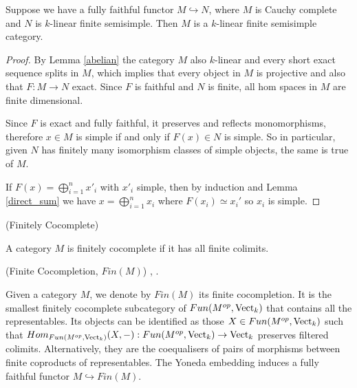 \begin{proposition}\label{cau_semi}

  \noindent Suppose we have a fully faithful functor $M\hookrightarrow N$,
  where $M$ is Cauchy complete and $N$ is $k$-linear finite semisimple. Then
  $M$ is a $k$-linear finite semisimple category.
\end{proposition}

\begin{proof}
  By Lemma \ref{abelian} the category $M$ also $k$-linear and every short
  exact sequence splits in $M$, which implies that every object in $M$ is
  projective and also that $F:M\to N$ exact. Since $F$ is faithful and $N$ is
  finite, all hom spaces in $M$ are finite dimensional.

  Since $F$ is exact and fully faithful, it preserves and reflects
  monomorphisms, therefore $x\in M$ is simple if and only if $F(x)\in N$ is
  simple. So in particular, given $N$ has finitely many isomorphism classes of
  simple objects, the same is true of $M$.

  If $F(x)=\bigoplus_{i=1}^n x'_i$ with $x'_i$ simple, then by induction and
  Lemma \ref{direct_sum} we have $x=\bigoplus_{i=1}^n x_i$ where
  $F(x_i)\simeq x_i'$ so $x_i$ is simple.
\end{proof}

\begin{definition}\label{definition/finitely-cocomplete} (Finitely Cocomplete)

  \noindent A category $M$ is finitely cocomplete if it has all finite colimits.
\end{definition}


\begin{definition} \label{definition/finite-cocompletion}
  (Finite Cocompletion, $Fin(M)$) \cite[Section 5.7]{kelly/basic-concepts-enriched}, \cite[Section 2.2.1]{lopezfranco/tensor-products}.

  \noindent Given a category $M$, we denote by $Fin(M)$ its finite
  cocompletion. It is the smallest finitely cocomplete subcategory of
  $Fun(M^{op},\operatorname{Vect}_k)$ that contains all the representables. Its objects can
  be identified as those $X\in Fun(M^{op},\operatorname{Vect}_k)$ such that
  $Hom_{Fun(M^{op},\operatorname{Vect}_k)}(X,-):Fun(M^{op},\operatorname{Vect}_k)\to \operatorname{Vect}_k$ preserves
  filtered colimits. Alternatively, they are the coequalisers of pairs of
  morphisms between finite coproducts of representables. The Yoneda embedding
  induces a fully faithful functor $M\hookrightarrow Fin(M)$.
\end{definition}

